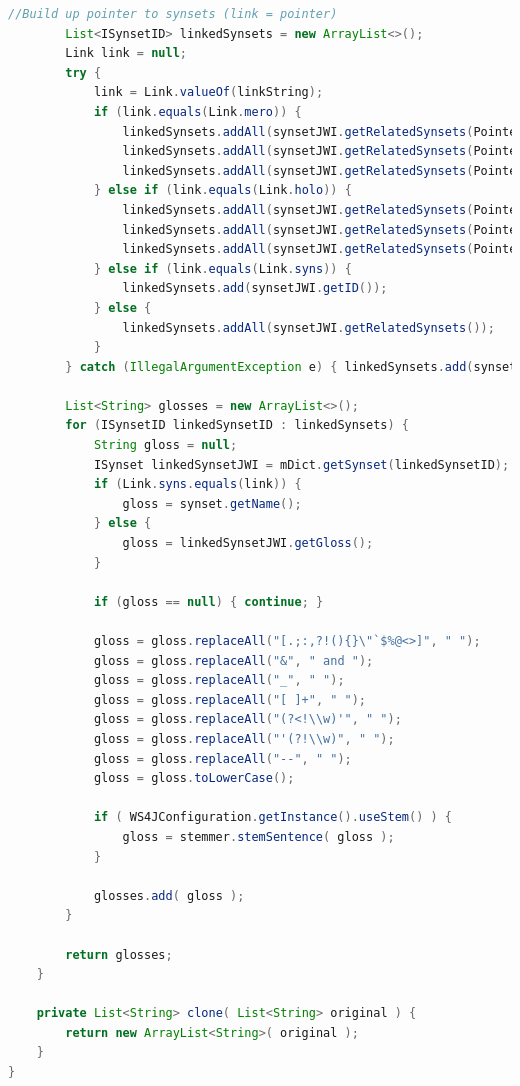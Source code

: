 \documentclass[11pt]{article}
\begin{document}
\begin{lstlisting}[language=Java]
        //Build up pointer to synsets (link = pointer)
        List<ISynsetID> linkedSynsets = new ArrayList<>();
        Link link = null;
        try {
            link = Link.valueOf(linkString);
            if (link.equals(Link.mero)) {
                linkedSynsets.addAll(synsetJWI.getRelatedSynsets(Pointer.MERONYM_MEMBER));
                linkedSynsets.addAll(synsetJWI.getRelatedSynsets(Pointer.MERONYM_SUBSTANCE));
                linkedSynsets.addAll(synsetJWI.getRelatedSynsets(Pointer.MERONYM_PART));
            } else if (link.equals(Link.holo)) {
                linkedSynsets.addAll(synsetJWI.getRelatedSynsets(Pointer.HOLONYM_MEMBER));
                linkedSynsets.addAll(synsetJWI.getRelatedSynsets(Pointer.HOLONYM_SUBSTANCE));
                linkedSynsets.addAll(synsetJWI.getRelatedSynsets(Pointer.HOLONYM_PART));
            } else if (link.equals(Link.syns)) {
                linkedSynsets.add(synsetJWI.getID());
            } else {
                linkedSynsets.addAll(synsetJWI.getRelatedSynsets());
            }
        } catch (IllegalArgumentException e) { linkedSynsets.add(synsetJWI.getID()); }

        List<String> glosses = new ArrayList<>();
        for (ISynsetID linkedSynsetID : linkedSynsets) {
            String gloss = null;
            ISynset linkedSynsetJWI = mDict.getSynset(linkedSynsetID);
            if (Link.syns.equals(link)) {
                gloss = synset.getName();
            } else {
                gloss = linkedSynsetJWI.getGloss();
            }

            if (gloss == null) { continue; }

            gloss = gloss.replaceAll("[.;:,?!(){}\"`$%@<>]", " ");
            gloss = gloss.replaceAll("&", " and ");
            gloss = gloss.replaceAll("_", " ");
            gloss = gloss.replaceAll("[ ]+", " ");
            gloss = gloss.replaceAll("(?<!\\w)'", " ");
            gloss = gloss.replaceAll("'(?!\\w)", " ");
            gloss = gloss.replaceAll("--", " ");
            gloss = gloss.toLowerCase();

            if ( WS4JConfiguration.getInstance().useStem() ) {
                gloss = stemmer.stemSentence( gloss );
            }

            glosses.add( gloss );
        }
      
        return glosses;
    }

    private List<String> clone( List<String> original ) {
        return new ArrayList<String>( original );
    }
}
\end{lstlisting}
\end{document}
